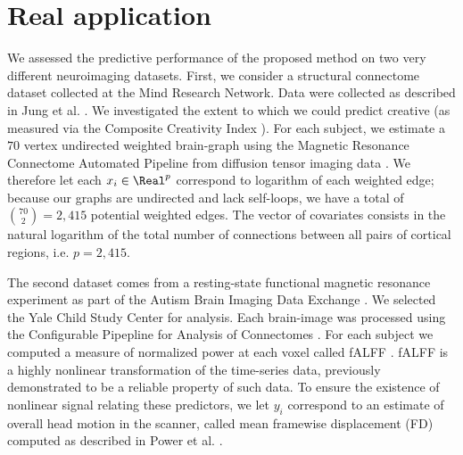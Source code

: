 \section{Real application}

We assessed the predictive performance of the proposed method on two very different neuroimaging datasets. First, we consider a structural connectome dataset collected at the Mind Research Network.  Data were collected as described in Jung et al. \cite{Jung2010}.
We investigated the extent to which we could predict creative (as measured via the Composite Creativity Index \cite{Arden2010}).   For each subject, we estimate a $70$ vertex undirected weighted brain-graph using the Magnetic Resonance Connectome Automated Pipeline \cite{MRCAP11} from diffusion tensor imaging data \cite{Mori2006}. We therefore let each $x_i \in \Real^p$ correspond to logarithm of each weighted edge; because our graphs are undirected and lack self-loops, we have a total of $\binom{70}{2}=2,415$ potential weighted edges.
The vector of covariates consists in the natural logarithm of the total number of connections between all pairs of cortical regions, i.e. $p=2,415$. 

The second dataset comes from a resting-state functional magnetic resonance experiment as part of the Autism Brain Imaging Data Exchange \cite{Autism}.  We selected the Yale Child Study Center for analysis.  Each brain-image was processed using the Configurable Pipepline for Analysis of Connectomes \cite{cpac}. For each subject we computed a measure of normalized power at each voxel called fALFF \cite{Zou2008}.  fALFF is a highly nonlinear transformation of the time-series data, previously demonstrated to be a reliable property of such data.  To ensure the existence of nonlinear signal relating these predictors, we let $y_i$ correspond to an estimate of overall head motion in the scanner, called mean framewise displacement (FD) computed as described in Power et al. \cite{power}.


